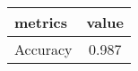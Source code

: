 \begin{tabular}{|l|c|}
\hline
 metrics &  value \\ \hline

Accuracy &  0.987 \\ \hline

\end{tabular}
